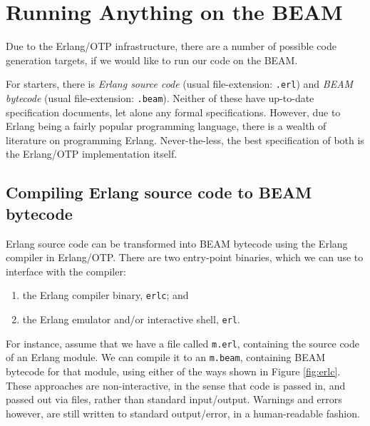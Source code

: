\section{Running Anything on the BEAM}

Due to the Erlang/OTP infrastructure, there are a number of possible
code generation targets, if we would like to run our code on the BEAM.

For starters, there is \emph{Erlang source code} (usual
file-extension: \texttt{.erl}) and \emph{BEAM bytecode} (usual
file-extension: \texttt{.beam}). Neither of these have up-to-date
specification documents\footnotemark, let alone any formal
specifications. However, due to Erlang being a fairly popular
programming language\footnotemark, there is a wealth of literature on
programming Erlang\footnotemark. Never-the-less, the best
specification of both is the Erlang/OTP implementation
itself\footnotemark.





\subsection{Compiling Erlang source code to BEAM bytecode}

Erlang source code can be transformed into BEAM bytecode using the
Erlang compiler in Erlang/OTP. There are two entry-point binaries,
which we can use to interface with the compiler:

\begin{enumerate}

\item the Erlang compiler binary, \texttt{erlc}; and

\item the Erlang emulator and/or interactive shell, \texttt{erl}.

\end{enumerate}

For instance, assume that we have a file called \texttt{m.erl},
containing the source code of an Erlang module. We can compile it to
an \texttt{m.beam}, containing BEAM bytecode for that module, using
either of the ways shown in Figure \ref{fig:erlc}. These approaches
are non-interactive, in the sense that code is passed in, and passed
out via files, rather than standard input/output. Warnings and errors
however, are still written to standard output/error, in a
human-readable fashion.

